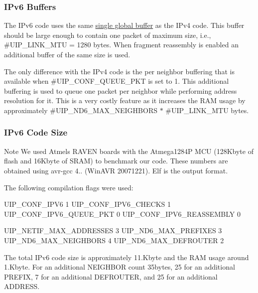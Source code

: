 \hypertarget{a00075_buffers}{}\subsubsection{I\+Pv6 Buffers}\label{a00075_buffers}
The I\+Pv6 code uses the same \hyperlink{a00074_memory}{single global buffer} as the I\+Pv4 code. This buffer should be large enough to contain one packet of maximum size, i.\+e., \#\+U\+I\+P\+\_\+\+L\+I\+N\+K\+\_\+\+M\+TU = 1280 bytes. When fragment reassembly is enabled an additional buffer of the same size is used.

The only difference with the I\+Pv4 code is the per neighbor buffering that is available when \#\+U\+I\+P\+\_\+\+C\+O\+N\+F\+\_\+\+Q\+U\+E\+U\+E\+\_\+\+P\+KT is set to 1. This additional buffering is used to queue one packet per neighbor while performing address resolution for it. This is a very costly feature as it increases the R\+AM usage by approximately \#\+U\+I\+P\+\_\+\+N\+D6\+\_\+\+M\+A\+X\+\_\+\+N\+E\+I\+G\+H\+B\+O\+RS $\ast$ \#\+U\+I\+P\+\_\+\+L\+I\+N\+K\+\_\+\+M\+TU bytes.



\hypertarget{a00075_size}{}\subsubsection{I\+Pv6 Code Size}\label{a00075_size}
\begin{DoxyNote}{Note}
We used Atmel\textquotesingle{}s R\+A\+V\+EN boards with the Atmega1284P M\+CU (128\+Kbyte of flash and 16\+Kbyte of S\+R\+AM) to benchmark our code. These numbers are obtained using \textquotesingle{}avr-\/gcc 4.. (Win\+A\+VR 20071221)\textquotesingle{}. Elf is the output format.

The following compilation flags were used\+: 
\begin{DoxyCode}
UIP\_CONF\_IPV6            1      
UIP\_CONF\_IPV6\_CHECKS     1      
UIP\_CONF\_IPV6\_QUEUE\_PKT  0      
UIP\_CONF\_IPV6\_REASSEMBLY 0      

UIP\_NETIF\_MAX\_ADDRESSES 3
UIP\_ND6\_MAX\_PREFIXES    3
UIP\_ND6\_MAX\_NEIGHBORS   4
UIP\_ND6\_MAX\_DEFROUTER   2
\end{DoxyCode}

\end{DoxyNote}
The total I\+Pv6 code size is approximately 11.\+Kbyte and the R\+AM usage around 1.\+Kbyte. For an additional N\+E\+I\+G\+H\+B\+OR count 35bytes, 25 for an additional P\+R\+E\+F\+IX, 7 for an additional D\+E\+F\+R\+O\+U\+T\+ER, and 25 for an additional A\+D\+D\+R\+E\+SS.



